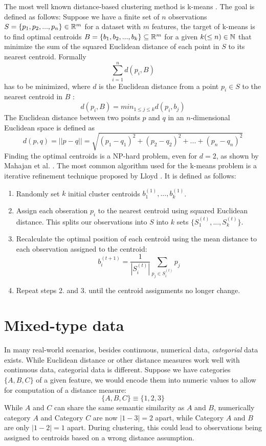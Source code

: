 The most well known distance-based clustering method is k-means \cite{kmeans}. The goal is defined as follows: Suppose we have a finite set of $n$ observations $S=\{p_1, p_2, ..., p_n\} \in \mathbb{R}^m$ for a dataset with $m$ features, the target of k-means is to find optimal centroids $B=\{b_1, b_2, ..., b_k\} \subseteq \mathbb{R}^m$ for a given $k (\leq n) \in \mathbb{N}$ that minimize the sum of the squared Euclidean distance of each point in $S$ to its nearest centroid. Formally
$$\sum_{i=1}^n  d(p_i, B)$$
has to be minimized, where $d$ is the Euclidean distance from a point $p_i \in S$ to the nearest centroid in $B$ \cite{kmeans_np_hard}: 
$$d(p_i, B) = min_{1 \leq j \leq k} d(p_i, b_j)$$
The Euclidean distance between two points $p$ and $q$ in an $n$-dimensional Euclidean space is defined as 
$$d(p, q) = || p - q || = \sqrt{(p_1 - q_1)^2 + (p_2 - q_2)^2 + ... + (p_n - q_n)^2}$$
Finding the optimal centroids is a NP-hard problem, even for $d=2$, as shown by Mahajan et al. \cite{kmeans_np_hard}. The most common algorithm used for the k-means problem is a iterative refinement technique proposed by Lloyd \cite{kmeans_lloyd}. It is defined as follows:
\begin{enumerate} 
	\item Randomly set $k$ initial cluster centroids $b_1^{(1)}, ..., b_k^{(1)}$.
	\item Assign each obseration $p_i$ to the nearest centroid using squared Euclidean distance. This splits our observations into $S$ into $k$ sets $\{S_1^{(t)}, ..., S_k^{(t)}\}$.
	\item Recalculate the optimal position of each centroid using the mean distance to each observation assigned to the centroid: 
$$b_i^{(t+1)} = \frac{1}{|S_i^{(t)}|} \sum_{p_j \in S_i^{(t)}} p_j$$
	\item Repeat steps 2. and 3. until the centroid assignments no longer change.
\end{enumerate}

\section{Mixed-type data}

In many real-world scenarios, besides continuous, numerical data, \textit{categorial} data exists. While Euclidean distance or other distance measures work well with continuous data, categorial data is different. Suppose we have categories $\{A, B, C\}$ of a given feature, we would encode them into numeric values to allow for computation of a distance measure:
$$\{A, B, C\} \equiv \{1, 2, 3\}$$
While $A$ and $C$ can share the same semantic similarity as $A$ and $B$, numerically category $A$ and Category $C$ are now $|1-3| = 2$ apart, while Category $A$ and $B$ are only $|1-2|=1$ apart. During clustering, this could lead to observations being assigned to centroids based on a wrong distance assumption.

